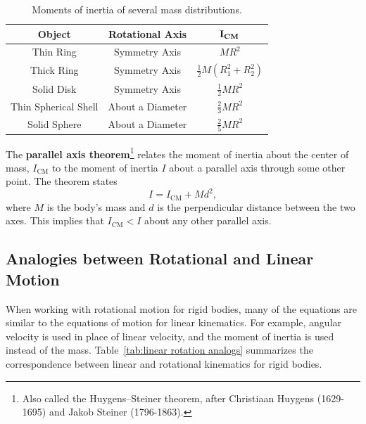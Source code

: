 \documentclass[addpoints]{physlabs}
\begin{document}
\begin{labsection}
\begin{theory}
    \begin{table}[ht]
        \centering
        \renewcommand{\arraystretch}{1.5}
        \begin{tabular}{|c|c|c|}
        \hline
        {\bf Object}         & {\bf Rotational Axis}          & $\mathbf{I_\text{\bf CM}}$                   \\
        \hline
        Thin Ring            & Symmetry Axis    & $MR^2$ \\
        Thick Ring           & Symmetry Axis    & $\frac{1}{2}M\left(R_1^2 + R_2^2\right)$ \\
        Solid Disk           & Symmetry Axis    & $\frac{1}{2}MR^2$ \\
        Thin Spherical Shell & About a Diameter & $\frac{2}{3}MR^2$ \\
        Solid Sphere         & About a Diameter & $\frac{2}{5}MR^2$ \\
        \hline
        \end{tabular}
        \caption{Moments of inertia of several mass distributions. \label{tab: Icm}}
    \end{table}

    The {\bf parallel axis theorem}\footnote{Also called the Huygens–Steiner theorem, after Christiaan Huygens (1629-1695) and Jakob Steiner (1796-1863).} relates the moment of inertia about the center of mass, $I_\text{CM}$ to the moment of inertia $I$ about a parallel axis through some other point. The theorem states
    \begin{equation}\label{eq:parallel axis theorem}
        I = I_\text{CM} + Md^2,
    \end{equation}
    where $M$ is the body's mass and $d$ is the perpendicular distance between the two axes. This implies that $I_\text{CM}<I$ about any other parallel axis.

    \subsection*{Analogies between Rotational and Linear Motion}
    When working with rotational motion for rigid bodies, many of the equations are similar to the equations of motion for linear kinematics. For example, angular velocity is used in place of linear velocity, and the moment of inertia is used instead of the mass. Table~\ref{tab:linear rotation analogs} summarizes the correspondence between linear and rotational kinematics for rigid bodies.


\end{theory}
\end{labsection}
\end{document}
